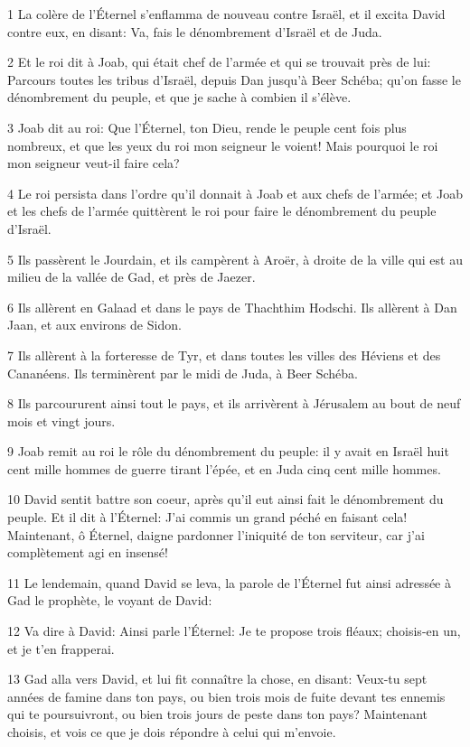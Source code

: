 \par 1 La colère de l'Éternel s'enflamma de nouveau contre Israël, et il excita David contre eux, en disant: Va, fais le dénombrement d'Israël et de Juda.
\par 2 Et le roi dit à Joab, qui était chef de l'armée et qui se trouvait près de lui: Parcours toutes les tribus d'Israël, depuis Dan jusqu'à Beer Schéba; qu'on fasse le dénombrement du peuple, et que je sache à combien il s'élève.
\par 3 Joab dit au roi: Que l'Éternel, ton Dieu, rende le peuple cent fois plus nombreux, et que les yeux du roi mon seigneur le voient! Mais pourquoi le roi mon seigneur veut-il faire cela?
\par 4 Le roi persista dans l'ordre qu'il donnait à Joab et aux chefs de l'armée; et Joab et les chefs de l'armée quittèrent le roi pour faire le dénombrement du peuple d'Israël.
\par 5 Ils passèrent le Jourdain, et ils campèrent à Aroër, à droite de la ville qui est au milieu de la vallée de Gad, et près de Jaezer.
\par 6 Ils allèrent en Galaad et dans le pays de Thachthim Hodschi. Ils allèrent à Dan Jaan, et aux environs de Sidon.
\par 7 Ils allèrent à la forteresse de Tyr, et dans toutes les villes des Héviens et des Cananéens. Ils terminèrent par le midi de Juda, à Beer Schéba.
\par 8 Ils parcoururent ainsi tout le pays, et ils arrivèrent à Jérusalem au bout de neuf mois et vingt jours.
\par 9 Joab remit au roi le rôle du dénombrement du peuple: il y avait en Israël huit cent mille hommes de guerre tirant l'épée, et en Juda cinq cent mille hommes.
\par 10 David sentit battre son coeur, après qu'il eut ainsi fait le dénombrement du peuple. Et il dit à l'Éternel: J'ai commis un grand péché en faisant cela! Maintenant, ô Éternel, daigne pardonner l'iniquité de ton serviteur, car j'ai complètement agi en insensé!
\par 11 Le lendemain, quand David se leva, la parole de l'Éternel fut ainsi adressée à Gad le prophète, le voyant de David:
\par 12 Va dire à David: Ainsi parle l'Éternel: Je te propose trois fléaux; choisis-en un, et je t'en frapperai.
\par 13 Gad alla vers David, et lui fit connaître la chose, en disant: Veux-tu sept années de famine dans ton pays, ou bien trois mois de fuite devant tes ennemis qui te poursuivront, ou bien trois jours de peste dans ton pays? Maintenant choisis, et vois ce que je dois répondre à celui qui m'envoie.
